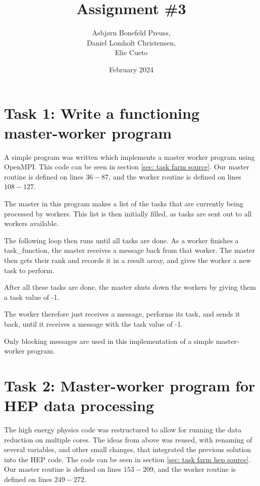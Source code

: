 \documentclass{article}
\title{Assignment \#3}
\author{Asbjørn Bonefeld Preuss,\\ Daniel Lomholt Christensen,\\ Elie Cueto}
\date{February 2024}
\begin{document}
\maketitle
\section{Task 1: Write a functioning master-worker program}
A simple program was written which implements a master worker program using OpenMPI. This code can be seen in section \ref{sec: task farm source}. Our master routine is defined on lines $36-87$, and the worker routine is defined on lines $108-127$. 

The master in this program makes a list of the tasks that are currently being processed by workers. This list is then initially filled, as tasks are sent out to all workers available.

The following loop then runs until all tasks are done.
As a worker finishes a task\_function, the master receives a message back from that worker. The master then gets their rank and records it in a result array, and gives the worker a new task to perform.

After all these tasks are done, the master shuts down the workers by giving them a task value of -1.

The worker therefore just receives a message, performs its task, and sends it back, until it receives a message with the task value of -1.

Only blocking messages are used in this implementation of a simple master-worker program.

\section{Task 2: Master-worker program for HEP data processing} 
The high energy physics code was restructured to allow for running the data reduction on multiple cores. The ideas from above was reused, with renaming of several variables, and other small changes, that integrated the previous solution into the HEP code. The code can be seen in section \ref{sec: task farm hep source}. Our master routine is defined on lines $153-209$, and the worker routine is defined on lines $249-272$. 
\end{document}
